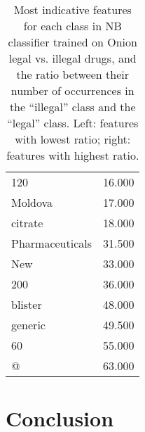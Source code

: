 \documentclass[11pt,a4paper,table]{article}
\begin{document}
\begin{table}
\begin{tabular}{lr}
120 & 16.000\\
Moldova & 17.000\\
citrate & 18.000\\
Pharmaceuticals & 31.500\\
New & 33.000\\
200 & 36.000\\
blister & 48.000\\
generic & 49.500\\
60 & 55.000\\
@ & 63.000\\
\end{tabular}
\caption{Most indicative features for each class in NB classifier
trained on Onion legal vs. illegal drugs,
and the ratio between their number of occurrences in the ``illegal''
class and the ``legal'' class.
Left: features with lowest ratio; right: features with highest ratio.
\label{tab:nb_weights}}
\end{table}

\section{Conclusion}
 














\end{document}

